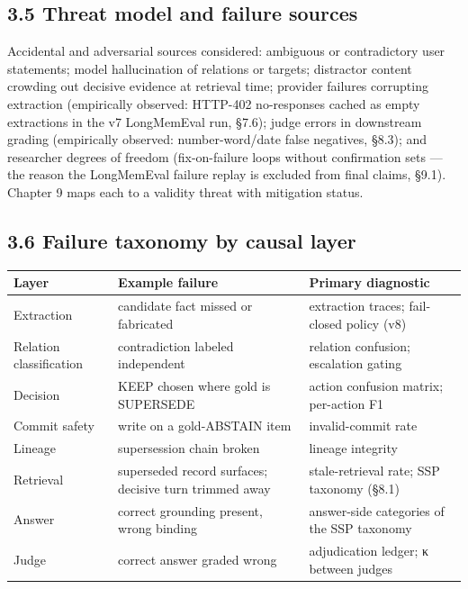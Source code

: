 \subsection{3.5 Threat model and failure
sources}\label{threat-model-and-failure-sources}

Accidental and adversarial sources considered: ambiguous or
contradictory user statements; model hallucination of relations or
targets; distractor content crowding out decisive evidence at retrieval
time; provider failures corrupting extraction (empirically observed:
HTTP-402 no-responses cached as empty extractions in the v7 LongMemEval
run, §7.6); judge errors in downstream grading (empirically observed:
number-word/date false negatives, §8.3); and researcher degrees of
freedom (fix-on-failure loops without confirmation sets --- the reason
the LongMemEval failure replay is excluded from final claims, §9.1).
Chapter 9 maps each to a validity threat with mitigation status.

\subsection{3.6 Failure taxonomy by causal
layer}\label{failure-taxonomy-by-causal-layer}

{\def\LTcaptype{none} %
\begin{longtable}[]{@{}
  >{\raggedright\arraybackslash}p{}
  >{\raggedright\arraybackslash}p{}
  >{\raggedright\arraybackslash}p{}@{}}
\toprule\noalign{}
\begin{minipage}[b]{\linewidth}\raggedright
\textbf{Layer}
\end{minipage} & \begin{minipage}[b]{\linewidth}\centering
\textbf{Example failure}
\end{minipage} & \begin{minipage}[b]{\linewidth}\centering
\textbf{Primary diagnostic}
\end{minipage} \\
\midrule\noalign{}
\endhead
\bottomrule\noalign{}
\endlastfoot
Extraction & candidate fact missed or fabricated & extraction traces;
fail-closed policy (v8) \\
Relation classification & contradiction labeled independent & relation
confusion; escalation gating \\
Decision & KEEP chosen where gold is SUPERSEDE & action confusion
matrix; per-action F1 \\
Commit safety & write on a gold-ABSTAIN item & invalid-commit rate \\
Lineage & supersession chain broken & lineage integrity \\
Retrieval & superseded record surfaces; decisive turn trimmed away &
stale-retrieval rate; SSP taxonomy (§8.1) \\
Answer & correct grounding present, wrong binding & answer-side
categories of the SSP taxonomy \\
Judge & correct answer graded wrong & adjudication ledger; κ between
judges \\
\end{longtable}
}

